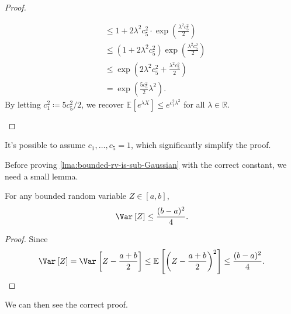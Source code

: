 \begin{proof}
\begin{itemize}
\begin{align*}
			       & \leq 1 + 2 \lambda ^2 c_5^2 \cdot \exp \left( \frac{\lambda ^2 c_5^2}{2} \right)                                                                                                                                                                                                                         \\
			       & \leq \left( 1 + 2 \lambda ^2 c_5^2 \right) \exp \left( \frac{\lambda ^2 c_5^2}{2} \right)                                                                                                                                                                                                                \\
			       & \leq \exp \left( 2\lambda ^2 c_5^2 + \frac{\lambda ^2 c_5^2}{2} \right) \tag*{\(1+x \leq e^x\)}                                                                                                                                                                                                          \\
			       & = \exp \left( \frac{5 c_5^2}{2} \lambda ^2 \right).
		      \end{align*}
		      By letting \(c_1^2 \coloneqq 5c_5^2 / 2\), we recover \(\mathbb{E}_{}\left[e^{\lambda X} \right] \leq e^{c_1^2 \lambda ^2}\) for all \(\lambda \in \mathbb{R} \).
	\end{itemize}
\end{proof}

\begin{note}
	It's possible to assume \(c_1, \dots , c_5 = 1\), which significantly simplify the proof.
\end{note}

Before proving \autoref{lma:bounded-rv-is-sub-Gaussian} with the correct constant, we need a small lemma.

\begin{lemma}\label{lma:variance-bound}
	For any bounded random variable \(Z\in [a, b]\),
	\[
		\Var_{}\left[Z \right] \leq \frac{(b-a)^2}{4}.
	\]
\end{lemma}
\begin{proof}
	Since
	\[
		\Var_{}\left[Z \right]
		= \Var_{}\left[Z - \frac{a+b}{2} \right]
		\leq \mathbb{E}_{}\left[\left( Z - \frac{a+b}{2} \right) ^2 \right]
		\leq \frac{(b-a)^2}{4}.
	\]
\end{proof}

We can then see the correct proof.

